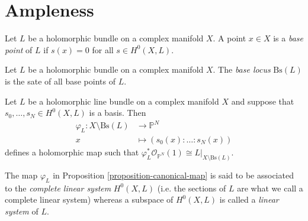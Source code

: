 \section{Ampleness}
\label{section-ampleness}

\begin{definition}
\label{definition-base-point}
\begin{reference}
\cite[Definition 2.3.25]{huc}
\end{reference}
Let $L$ be a holomorphic bundle on a complex manifold $X$. A point $x \in X$ is
a {\it base point} of $L$ if $s(x)=0$ for all $s\in H^{0}(X,L)$. 
\end{definition}

\begin{definition}
\label{definition-base-locus}
\begin{reference}
\cite[Definition 2.3.25]{huc}
\end{reference}
Let $L$ be a holomorphic bundle on a complex manifold $X$. 
The {\it base locus} $\text{Bs}(L)$ is the sate of all base points of $L$.
\end{definition}

\begin{proposition}
\label{proposition-canonical-map}
\begin{reference}
\cite[Proposition 2.3.26]{huc}
\end{reference}
Let $L$ be a holomorphic line bundle on a complex manifold $X$ and suppose that
$s_0,\ldots,s_N\in H^{0}(X,L)$ is a basis. Then
\begin{align*}
\varphi_L: X\setminus\text{Bs}(L) &\longrightarrow \mathbb{P}^N \\
x &\longmapsto (s_0(x):\ldots:s_N(x))
\end{align*}
defines a holomorphic map such that $\varphi^*
_L\mathcal{O}_{\mathbb{P}^N}(1)\cong L|_{X\setminus\text{Bs}(L)}$.
\end{proposition}

\begin{definition}
\label{definition-linear-system}
\begin{reference}
\cite[p. 86]{huc}
\end{reference}
The map $\varphi_L$ in Proposition \ref{proposition-canonical-map} is said to be
associated to the {\it complete linear system} $H^{0}(X,L)$ (i.e. the sections
of $L$ are what we call a complete linear system) whereas a subspace of 
$H^{0}(X,L)$ is called a {\it linear system} of $L$.
\end{definition}

